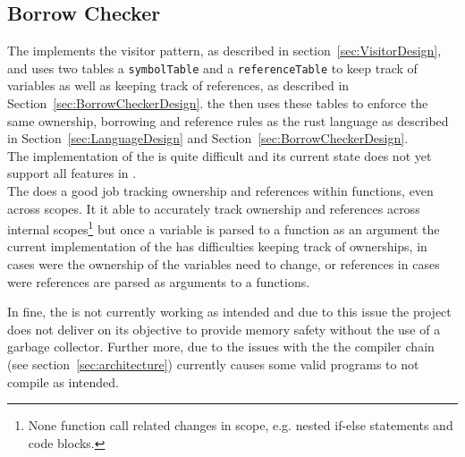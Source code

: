 \subsection{Borrow Checker}
\label{sec:BorrowCheckerImpl}

The \borrowChecker{} implements the visitor pattern, as described in
section~\ref{sec:VisitorDesign}, and uses two tables a
\texttt{symbolTable} and a \texttt{referenceTable} to keep track of variables as well
as keeping track of references, as described in
Section~\ref{sec:BorrowCheckerDesign}. the \borrowChecker{} then uses these tables to enforce the
same ownership, borrowing and reference rules as the rust language as described
in Section~\ref{sec:LanguageDesign} and Section~\ref{sec:BorrowCheckerDesign}. \\

The implementation of the \borrowChecker{} is quite difficult and its current state
does not yet support all features in \lang{}. \\

The \borrowChecker{} does a good job tracking ownership and references within
functions, even across scopes. It it able to accurately track ownership and
references across internal scopes\footnote{None function call related changes in
scope, e.g. nested if-else statements and code blocks.} but once a variable is parsed
to a function as an argument the current implementation of the \borrowChecker{} has
difficulties keeping track of ownerships, in cases were the ownership of the
variables need to change, or references in cases were references are parsed as
arguments to a functions.

In fine, the \borrowChecker{} is not currently working as intended and due to this
issue the project does not deliver on its objective to provide memory safety without
the use of a garbage collector. Further more, due to the issues with the
\borrowChecker{} the compiler chain (see section~\ref{sec:architecture}) currently
causes some valid programs to not compile as intended.
